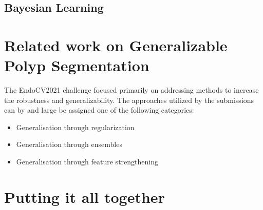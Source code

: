 	\subsection{Bayesian Learning}
	\subsection{}

\section{Related work on Generalizable Polyp Segmentation}
	The EndoCV2021 challenge focused primarily on addressing methods to increase the robustness and generalizability. The approaches utilized by the submissions can by and large be assigned one of the following categories:
	\begin{itemize}
		\item Generalisation through regularization
		\item Generalisation through ensembles
		\item Generalisation through feature strengthening 
	\end{itemize}
		
	\section{Putting it all together}